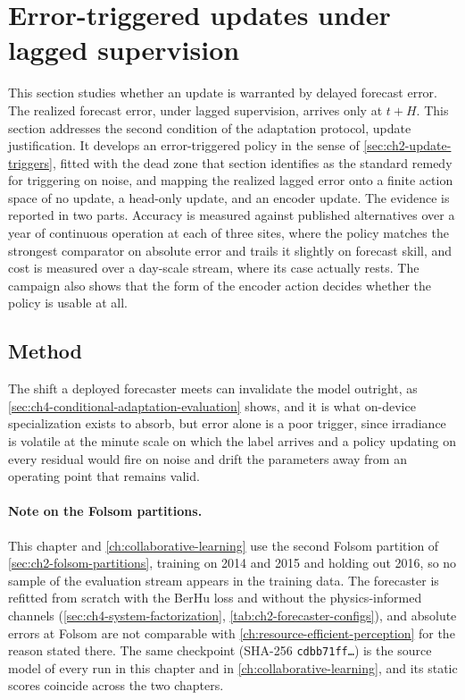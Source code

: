 \section{Error-triggered updates under lagged supervision}
\label{sec:ch4-conditional-adaptation}
This section studies whether an update is warranted by delayed forecast error. The realized forecast error, under lagged supervision, arrives only at $t+H$. This section addresses the second condition of the adaptation protocol, update justification. It develops an error-triggered policy in the sense of \cref{sec:ch2-update-triggers}, fitted with the dead zone that section identifies as the standard remedy for triggering on noise, and mapping the realized lagged error onto a finite action space of no update, a head-only update, and an encoder update. The evidence is reported in two parts. Accuracy is measured against published alternatives over a year of continuous operation at each of three sites, where the policy matches the strongest comparator on absolute error and trails it slightly on forecast skill, and cost is measured over a day-scale stream, where its case actually rests. The campaign also shows that the form of the encoder action decides whether the policy is usable at all.

\subsection{Method}
\label{sec:ch4-conditional-adaptation-method}
The shift a deployed forecaster meets can invalidate the model outright, as \cref{sec:ch4-conditional-adaptation-evaluation} shows, and it is what on-device specialization exists to absorb, but error alone is a poor trigger, since irradiance is volatile at the minute scale on which the label arrives and a policy updating on every residual would fire on noise and drift the parameters away from an operating point that remains valid.

\paragraph{Note on the Folsom partitions.} This chapter and \cref{ch:collaborative-learning} use the second Folsom partition of \cref{sec:ch2-folsom-partitions}, training on 2014 and 2015 and holding out 2016, so no sample of the evaluation stream appears in the training data. The forecaster is refitted from scratch with the BerHu loss and without the physics-informed channels (\cref{sec:ch4-system-factorization}, \cref{tab:ch2-forecaster-configs}), and absolute errors at Folsom are not comparable with \cref{ch:resource-efficient-perception} for the reason stated there. The same checkpoint (SHA-256 \texttt{cdbb71ff\ldots}) is the source model of every run in this chapter and in \cref{ch:collaborative-learning}, and its static scores coincide across the two chapters.

